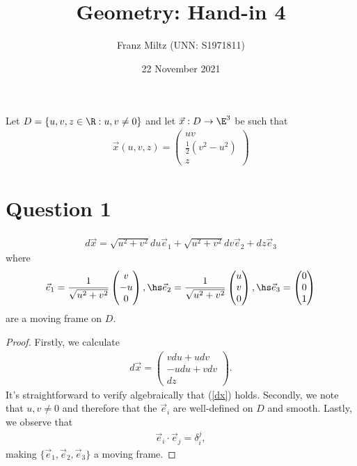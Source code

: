 \documentclass{article}
\begin{document}
\title{Geometry: Hand-in 4}
\author{Franz Miltz (UNN: S1971811)}
\date{22 November 2021}
\maketitle
\noindent Let $D=\{u,v,z\in\R : u,v\not=0\}$ and let $\vec x:D\to\E^3$ be such that 
\begin{align*}
   \vec x(u,v,z) = \begin{pmatrix}
      uv \\ \frac{1}{2}(v^2 - u^2) \\ z
   \end{pmatrix}
\end{align*}

\section*{Question 1}

\begin{claim*}
   \begin{align}
      \label{dx}
      d\vec x = \sqrt{u^2 + v^2}du\vec e_1
      + \sqrt{u^2 + v^2}dv \vec e_2
      + dz\vec e_3
   \end{align}
   where
   \begin{align*}
      \vec e_1 = \frac{1}{\sqrt{u^2 + v^2}}\begin{pmatrix}
         v \\ -u \\ 0
      \end{pmatrix} , \hs
      \vec e_2 = \frac{1}{\sqrt{u^2 + v^2}}\begin{pmatrix}
         u \\ v \\ 0
      \end{pmatrix}, \hs 
      \vec e_3 = \begin{pmatrix}
         0 \\ 0 \\ 1
      \end{pmatrix}
   \end{align*}
   are a moving frame on $D$.
\end{claim*}
\begin{proof}
   Firstly, we calculate 
   \begin{align*}
      d\vec x = \begin{pmatrix}
         v du + u dv \\
         -u du + v dv \\
         dz
      \end{pmatrix}.
   \end{align*} 
   It's straightforward to verify algebraically that (\ref{dx}) holds. Secondly,
   we note that $u,v\not=0$ and therefore that the $\vec e_i$ are well-defined on $D$
   and smooth. Lastly, we observe that 
   \begin{align}
      \vec e_i \cdot \vec e_j = \delta_i^j,
   \end{align}
   making $\{\vec e_1, \vec e_2, \vec e_3\}$ a moving frame.
\end{proof}
\end{document}
